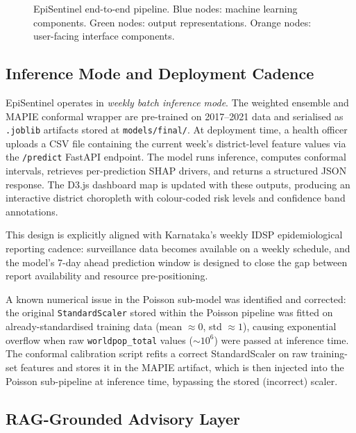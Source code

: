 \documentclass[conference]{IEEEtran}
\begin{document}
\begin{figure}[htbp]
  \caption{EpiSentinel end-to-end pipeline. Blue nodes: machine
  learning components. Green nodes: output representations. Orange
  nodes: user-facing interface components.}
  \label{fig:arch}
\end{figure}

\subsection{Inference Mode and Deployment Cadence}

EpiSentinel operates in \emph{weekly batch inference mode}. The
weighted ensemble and MAPIE conformal wrapper are pre-trained on
2017--2021 data and serialised as \texttt{.joblib} artifacts stored
at \texttt{models/final/}. At deployment time, a health officer
uploads a CSV file containing the current week's district-level
feature values via the \texttt{/predict} FastAPI endpoint. The
model runs inference, computes conformal intervals, retrieves
per-prediction SHAP drivers, and returns a structured JSON response.
The D3.js dashboard map is updated with these outputs, producing an
interactive district choropleth with colour-coded risk levels and
confidence band annotations.

This design is explicitly aligned with Karnataka's weekly IDSP
epidemiological reporting cadence: surveillance data becomes
available on a weekly schedule, and the model's 7-day ahead
prediction window is designed to close the gap between report
availability and resource pre-positioning.

A known numerical issue in the Poisson sub-model was identified and
corrected: the original \texttt{StandardScaler} stored within the
Poisson pipeline was fitted on already-standardised training data
(mean $\approx 0$, std $\approx 1$), causing exponential overflow
when raw \texttt{worldpop\_total} values ($\sim 10^6$) were passed
at inference time. The conformal calibration script refits a correct
StandardScaler on raw training-set features and stores it in the
MAPIE artifact, which is then injected into the Poisson sub-pipeline
at inference time, bypassing the stored (incorrect) scaler.

\subsection{RAG-Grounded Advisory Layer}
\end{document}
